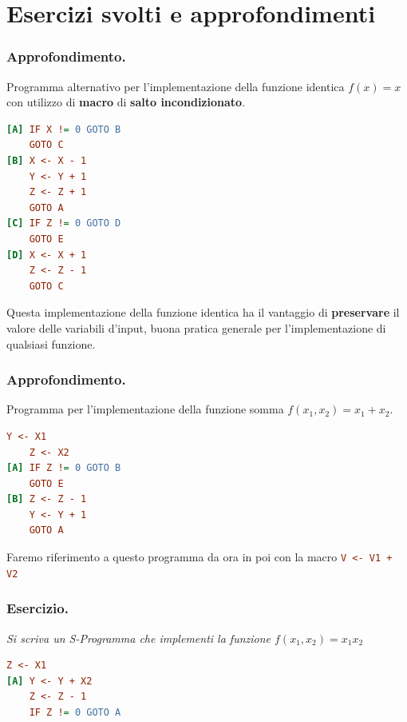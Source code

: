 
\section{Esercizi svolti e approfondimenti}

\subsubsection*{Approfondimento.} Programma alternativo per l'implementazione della funzione identica \(f(x)=x\) con utilizzo di \textbf{macro} di \textbf{salto incondizionato}.

\begin{lstlisting}[language=ini, label={Funzione Identica AltVer},  caption=Funzione identica]
[A] IF X != 0 GOTO B
    GOTO C
[B] X <- X - 1
    Y <- Y + 1
    Z <- Z + 1
    GOTO A
[C] IF Z != 0 GOTO D
    GOTO E
[D] X <- X + 1
    Z <- Z - 1
    GOTO C
\end{lstlisting}

Questa implementazione della funzione identica ha il vantaggio di \textbf{preservare} il valore delle variabili d'input, buona pratica generale per l'implementazione di qualsiasi funzione.

\subsubsection*{Approfondimento.} Programma per l'implementazione della funzione somma \(f(x_1,x_2)=x_1+x_2\).

\begin{lstlisting}[language=ini, label={Funzione Somma},  caption=Funzione somma]
    Y <- X1
    Z <- X2
[A] IF Z != 0 GOTO B
    GOTO E
[B] Z <- Z - 1
    Y <- Y + 1
    GOTO A
\end{lstlisting}

Faremo riferimento a questo programma da ora in poi con la macro \lstinline[language=ini]{V <- V1 + V2}

\newpage

\subsubsection*{Esercizio.} \textit{Si scriva un S-Programma che implementi la funzione \(f(x_1,x_2)=x_1x_2\)}

\begin{lstlisting}[language=ini, label={Funzione Prodotto},  caption=Funzione prodotto]
    Z <- X1
[A] Y <- Y + X2
    Z <- Z - 1
    IF Z != 0 GOTO A
\end{lstlisting}

